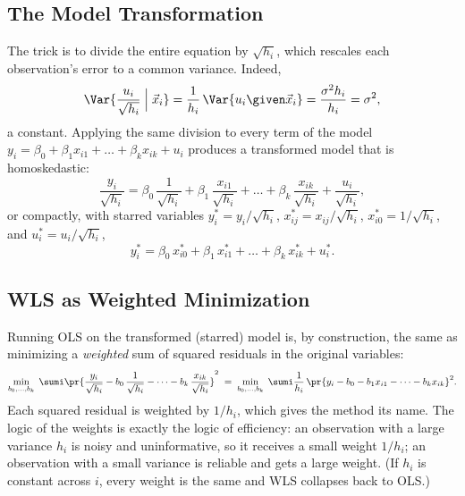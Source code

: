 \subsection{The Model Transformation}

The trick is to divide the entire equation by $\sqrt{h_i}$, which rescales each observation's error to a common variance. Indeed,
\[
\Var{\frac{u_i}{\sqrt{h_i}}\;\Big|\;\vec x_i} = \frac{1}{h_i}\,\Var{u_i \given \vec x_i} = \frac{\sigma^2 h_i}{h_i} = \sigma^2 ,
\]
a constant. Applying the same division to every term of the model $y_i = \beta_0 + \beta_1 x_{i1} + \dots + \beta_k x_{ik} + u_i$ produces a transformed model that is homoskedastic:
\[
\frac{y_i}{\sqrt{h_i}}
= \beta_0\,\frac{1}{\sqrt{h_i}}
+ \beta_1\,\frac{x_{i1}}{\sqrt{h_i}}
+ \dots
+ \beta_k\,\frac{x_{ik}}{\sqrt{h_i}}
+ \frac{u_i}{\sqrt{h_i}},
\]
or compactly, with starred variables $y_i^* = y_i/\sqrt{h_i}$, $x_{ij}^* = x_{ij}/\sqrt{h_i}$, $x_{i0}^* = 1/\sqrt{h_i}$, and $u_i^* = u_i/\sqrt{h_i}$,
\[
y_i^* = \beta_0\, x_{i0}^* + \beta_1\, x_{i1}^* + \dots + \beta_k\, x_{ik}^* + u_i^* .
\]


\subsection{WLS as Weighted Minimization}

Running OLS on the transformed (starred) model is, by construction, the same as minimizing a \emph{weighted} sum of squared residuals in the original variables:
\[
\min_{b_0,\dots,b_k}\;
\sumi \pr{\frac{y_i}{\sqrt{h_i}} - b_0\,\frac{1}{\sqrt{h_i}} - \dots - b_k\,\frac{x_{ik}}{\sqrt{h_i}}}^2
\;=\;
\min_{b_0,\dots,b_k}\;
\sumi \frac{1}{h_i}\,\pr{y_i - b_0 - b_1 x_{i1} - \dots - b_k x_{ik}}^2 .
\]
Each squared residual is weighted by $1/h_i$, which gives the method its name. The logic of the weights is exactly the logic of efficiency: an observation with a large variance $h_i$ is noisy and uninformative, so it receives a small weight $1/h_i$; an observation with a small variance is reliable and gets a large weight. (If $h_i$ is constant across $i$, every weight is the same and WLS collapses back to OLS.)

